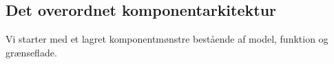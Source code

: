 \subsection{Det overordnet komponentarkitektur}
\label{sec:overordnetkomponent}


Vi starter med et lagret komponentmønstre bestående af model, funktion og grænseflade. 

\begin{figure}
  \centering
  \scalebox{0.7}{
    
  }
  \label{fig:komponenter}
\end{figure}
